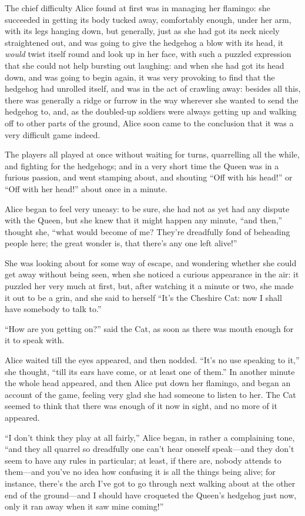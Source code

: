 \documentclass[11pt,openany,oneside]{book}
\begin{document}
The chief difficulty Alice found at first was in managing her flamingo: she succeeded in getting its body tucked away, comfortably enough, under her arm, with its legs hanging down, but generally, just as she had got its neck nicely straightened out, and was going to give the hedgehog a blow with its head, it {\em would\/} twist itself round and look up in her face, with such a puzzled expression that she could not help bursting out laughing: and when she had got its head down, and was going to begin again, it was very provoking to find that the hedgehog had unrolled itself, and was in the act of crawling away: besides all this, there was generally a ridge or furrow in the way wherever she wanted to send the hedgehog to, and, as the doubled-up soldiers were always getting up and walking off to other parts of the ground, Alice soon came to the conclusion that it was a very difficult game indeed. 

The players all played at once without waiting for turns, quarrelling all the while, and fighting for the hedgehogs; and in a very short time the Queen was in a furious passion, and went stamping about, and shouting “Off with his head!” or “Off with her head!” about once in a minute. 

Alice began to feel very uneasy: to be sure, she had not as yet had any dispute with the Queen, but she knew that it might happen any minute, “and then,” thought she, “what would become of me? They’re dreadfully fond of beheading people here; the great wonder is, that there’s any one left alive!” 

She was looking about for some way of escape, and wondering whether she could get away without being seen, when she noticed a curious appearance in the air: it puzzled her very much at first, but, after watching it a minute or two, she made it out to be a grin, and she said to herself “It’s the Cheshire Cat: now I shall have somebody to talk to.” 

“How are you getting on?” said the Cat, as soon as there was mouth enough for it to speak with. 

Alice waited till the eyes appeared, and then nodded. “It’s no use speaking to it,” she thought, “till its ears have come, or at least one of them.” In another minute the whole head appeared, and then Alice put down her flamingo, and began an account of the game, feeling very glad she had someone to listen to her. The Cat seemed to think that there was enough of it now in sight, and no more of it appeared. 

“I don’t think they play at all fairly,” Alice began, in rather a complaining tone, “and they all quarrel so dreadfully one can’t hear oneself speak—and they don’t seem to have any rules in particular; at least, if there are, nobody attends to them—and you’ve no idea how confusing it is all the things being alive; for instance, there’s the arch I’ve got to go through next walking about at the other end of the ground—and I should have croqueted the Queen’s hedgehog just now, only it ran away when it saw mine coming!” 
\end{document}
